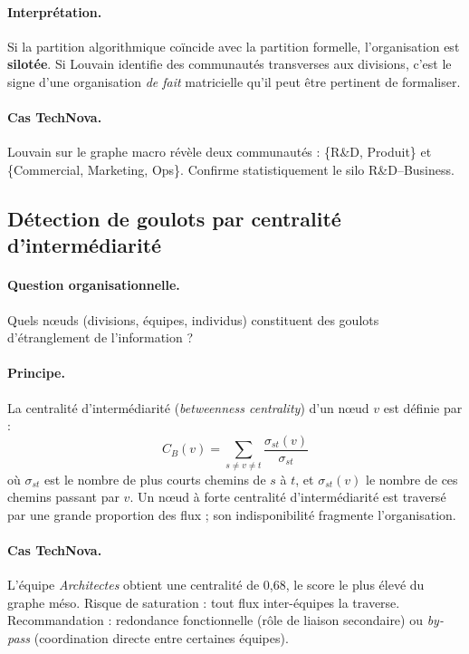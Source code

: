 \documentclass[11pt,a4paper]{article}
\begin{document}
\paragraph{Interprétation.} Si la partition algorithmique coïncide avec la partition formelle, l'organisation est \textbf{silotée}. Si Louvain identifie des communautés transverses aux divisions, c'est le signe d'une organisation \emph{de fait} matricielle qu'il peut être pertinent de formaliser.

\paragraph{Cas TechNova.} Louvain sur le graphe macro révèle deux communautés : \{R\&D, Produit\} et \{Commercial, Marketing, Ops\}. Confirme statistiquement le silo R\&D--Business.

\subsection{Détection de goulots par centralité d'intermédiarité}

\paragraph{Question organisationnelle.} Quels nœuds (divisions, équipes, individus) constituent des goulots d'étranglement de l'information ?

\paragraph{Principe.} La centralité d'intermédiarité (\textit{betweenness centrality}) d'un nœud $v$ est définie par :
\[
C_B(v) = \sum_{s \neq v \neq t} \frac{\sigma_{st}(v)}{\sigma_{st}}
\]
où $\sigma_{st}$ est le nombre de plus courts chemins de $s$ à $t$, et $\sigma_{st}(v)$ le nombre de ces chemins passant par $v$. Un nœud à forte centralité d'intermédiarité est traversé par une grande proportion des flux ; son indisponibilité fragmente l'organisation.

\paragraph{Cas TechNova.} L'équipe \emph{Architectes} obtient une centralité de 0,68, le score le plus élevé du graphe méso. Risque de saturation : tout flux inter-équipes la traverse. Recommandation : redondance fonctionnelle (rôle de liaison secondaire) ou \emph{by-pass} (coordination directe entre certaines équipes).
\end{document}
